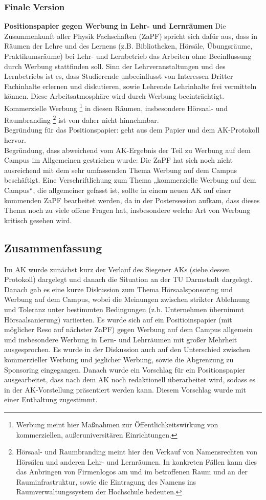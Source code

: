 		\subsubsection{Finale Version}
			\textbf{Positionspapier gegen Werbung in Lehr- und Lernräumen}
				Die Zusammenkunft aller Physik Fachschaften (ZaPF) spricht sich dafür aus, dass in Räumen der Lehre und des Lernens (z.B. Bibliotheken, Hörsäle, Übungsräume, Praktikumsräume) bei Lehr- und Lernbetrieb das Arbeiten ohne Beeinflussung durch Werbung stattfinden soll. Sinn der Lehrveranstaltungen und des Lernbetriebs ist es, dass Studierende unbeeinflusst von Interessen Dritter Fachinhalte erlernen und diskutieren, sowie Lehrende Lehrinhalte frei vermitteln können. Diese Arbeitsatmosphäre wird durch Werbung beeinträchtigt.
				Kommerzielle Werbung \footnote{Werbung meint hier Maßnahmen zur Öffentlichkeitswirkung von kommerziellen, außeruniversitären Einrichtungen.} in diesen Räumen, insbesondere Hörsaal- und Raumbranding \footnote{Hörsaal- und Raumbranding meint hier den Verkauf von Namensrechten von Hörsälen und anderen Lehr- und Lernräumen. In konkreten Fällen kann dies das Anbringen von Firmenlogos am und im betroffenen Raum und an der Rauminfrastruktur, sowie die Eintragung des Namens ins Raumverwaltungssystem der Hochschule bedeuten.} ist von daher nicht hinnehmbar. \\

				Begründung für das Positionspapier:
				geht aus dem Papier und dem AK-Protokoll hervor. \\

				Begründung, dass abweichend vom AK-Ergebnis der  Teil zu  Werbung auf dem Campus im Allgemeinen gestrichen wurde:
				Die ZaPF hat sich noch nicht ausreichend mit dem sehr umfassenden Thema Werbung auf dem Campus beschäftigt. Eine Verschriftlichung zum Thema „kommerzielle Werbung auf dem Campus“, die allgemeiner gefasst ist, sollte in einem neuen AK auf einer kommenden ZaPF bearbeitet werden, da in der Postersession aufkam, dass dieses Thema noch zu viele offene Fragen hat, insbesondere welche Art von Werbung kritisch gesehen wird.

	\subsection{Zusammenfassung}
		Im AK wurde zunächst kurz der Verlauf des Siegener AKs (siehe dessen Protokoll) dargelegt und danach die Situation an der TU Darmstadt dargelegt. Danach gab es eine kurze Diskussion zum Thema Hörsaalsponsoring und Werbung auf dem Campus, wobei die Meinungen zwischen strikter Ablehnung und Toleranz unter bestimmten Bedingungen (z.b. Unternehmen übernimmt Hörsaalsanierung) variierten. Es wurde sich auf ein Positioinspapier (mit möglicher Reso auf nächster ZaPF) gegen Werbung auf dem Campus allgemein und insbesondere Werbung in Lern- und Lehrräumen mit großer Mehrheit ausgesprochen. Es wurde in der Diskussion auch auf den Unterschied zwischen kommerzieller Werbung und jeglicher Werbung, sowie die Abgrenzung zu Sponsoring eingegangen. Danach wurde ein Vorschlag für ein Positionspapier ausgearbeitet, dass nach dem AK noch redaktionell überarbeitet wird, sodass es in der AK-Vorstellung präsentiert werden kann. Diesem Vorschlag wurde mit einer Enthaltung zugestimmt.
